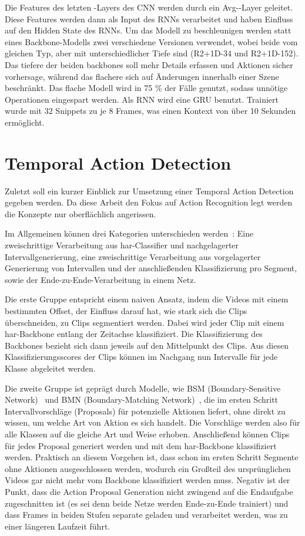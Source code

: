 Die Features des letzten \conv-Layers des CNN werden durch ein Avg-\pool-Layer geleitet.
Diese Features werden dann als Input des RNNs verarbeitet und haben Einfluss auf den Hidden State des RNNs.
Um das Modell zu beschleunigen werden statt eines Backbone-Modells zwei verschiedene Versionen verwendet, wobei beide vom gleichen Typ, aber mit unterschiedlicher Tiefe sind (\zB R2+1D-34 und R2+1D-152).
Das tiefere der beiden backbones soll mehr Details erfassen und Aktionen sicher vorhersage, während das flachere sich auf Änderungen innerhalb einer Szene beschränkt.
Das flache Modell wird in 75 \% der Fälle genutzt, sodass unnötige Operationen eingespart werden.
Als RNN wird eine GRU benutzt.
Trainiert wurde mit 32 Snippets zu je 8 Frames, was einen Kontext von über 10 Sekunden ermöglicht.

\section{Temporal Action Detection}
\label{sec:temporal-action-detection}

Zuletzt soll ein kurzer Einblick zur Umsetzung einer Temporal Action Detection gegeben werden.
Da diese Arbeit den Fokus auf Action Recognition legt werden die Konzepte nur oberflächlich angerissen.

Im Allgemeinen können drei Kategorien unterschieden werden~\cite{Buch17}:
Eine zweischrittige Verarbeitung aus \gls{har}-Classifier und nachgelagerter Intervallgenerierung, eine zweischrittige Verarbeitung aus vorgelagerter Generierung von Intervallen und der anschließenden Klassifizierung pro Segment, sowie der Ende-zu-Ende-Verarbeitung in einem Netz.

Die erste Gruppe entspricht einem naiven Ansatz, indem die Videos mit einem bestimmten Offset, der Einfluss darauf hat, wie stark sich die Clips überschneiden, zu Clips segmentiert werden.
Dabei wird jeder Clip mit einem \gls{har}-Backbone entlang der Zeitachse klassifiziert.
Die Klassifizierung des Backbones bezieht sich dann jeweils auf den Mittelpunkt des Clips.
Aus diesen Klassifizierungsscores der Clips können im Nachgang nun Intervalle für jede Klasse abgeleitet werden.

Die zweite Gruppe ist geprägt durch Modelle, wie BSM (Boundary-Sensitive Network)~\cite{Lin18} und BMN (Boundary-Matching Network)~\cite{Lin19}, die im ersten Schritt Intervallvorschläge (Proposals) für potenzielle Aktionen liefert, ohne direkt zu wissen, um welche Art von Aktion es sich handelt.
Die Vorschläge werden also für alle Klassen auf die gleiche Art und Weise erhoben.
Anschließend können Clips für jedes Proposal generiert werden und mit dem \gls{har}-Backbone klassifiziert werden.
Praktisch an diesem Vorgehen ist, dass schon im ersten Schritt Segmente ohne Aktionen ausgeschlossen werden, wodurch ein Großteil des ursprünglichen Videos gar nicht mehr vom Backbone klassifiziert werden muss.
Negativ ist der Punkt, dass die Action Proposal Generation nicht zwingend auf die Endaufgabe zugeschnitten ist (es sei denn beide Netze werden Ende-zu-Ende trainiert) und dass Frames in beiden Stufen separate geladen und verarbeitet werden, was zu einer längeren Laufzeit führt.

